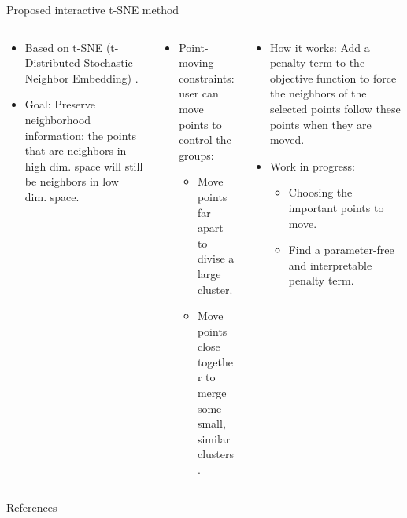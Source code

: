 \documentclass{beamer}
\begin{document}
\begin{frame}[fragile]
\begin{block}{Proposed interactive t-SNE method}
  \begin{columns}
    \begin{column}{.32\textwidth}
      \begin{itemize}
      \item Based on t-SNE (t-Distributed Stochastic Neighbor Embedding) \cite{maaten2008tsne}.
      \item Goal: Preserve neighborhood information: the points that are neighbors in high dim. space
        will still be neighbors in low dim. space.
      \end{itemize}
    \end{column}

    \begin{column}{.25\textwidth}
      \begin{itemize}
        \item Point-moving constraints: user can move points to control the groups:
          \begin{itemize}
            \item Move points far apart to divise a large cluster.
            \item Move points close together to merge some small, similar clusters.
          \end{itemize}
      \end{itemize}
    \end{column}

    \begin{column}{.42\textwidth}
      \begin{itemize}
        \item How it works: Add a {\color{blue} penalty term} to the objective function
          to force the neighbors of the {\color{red} selected points} follow {\color{red}these points} when they are moved.
        \item Work in progress:
          \begin{itemize}
            \item Choosing the important points to move.
            \item Find a parameter-free and interpretable {\color{blue} penalty term}.
          \end{itemize}
      \end{itemize}
    \end{column}

  \end{columns}

\end{block}


\begin{block}{References}
% 
% 
{\tiny  \printbibliography }
\end{block}


\end{frame}
\end{document}
